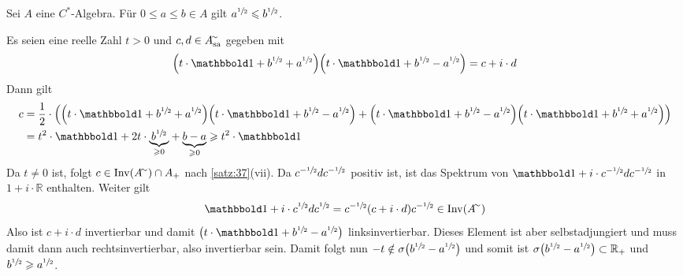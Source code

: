 \begin{satz}[{name=[Die Wurzel ist monoton]}]
	Sei $A$ eine $C^*$-Algebra. Für $0 \le a \le b \in A$ gilt $a^{\sfrac{1}{2}} \leqslant b^{\sfrac{1}{2}}$.
\end{satz}
\begin{beweis}
	Es seien eine reelle Zahl $t >0$ und $c,d \in A_\sa^\simm$ gegeben mit 
	\[
		\enbrace*{t \cdot \ind + b^{\sfrac{1}{2}} + a^{\sfrac{1}{2}}} \enbrace*{t \cdot \ind + b^{\sfrac{1}{2}} - a^{\sfrac{1}{2}}} = c + i \cdot d
	\]
	Dann gilt 
	\begin{align}
		c &=\frac{1}{2} \cdot \enbrace*{\enbrace*{t \cdot \ind + b^{\sfrac{1}{2}} + a^{\sfrac{1}{2}}}\enbrace*{t \cdot \ind + b^{\sfrac{1}{2}} -a^{\sfrac{1}{2}}} 
		+ \enbrace*{t \cdot \ind + b^{\sfrac{1}{2}}-a^{\sfrac{1}{2}}} \enbrace*{t \cdot \ind + b^{\sfrac{1}{2}} + a^{\sfrac{1}{2}}} } \\
		&= t^2 \cdot \ind + 2 t \cdot \Underbrace{b^{\sfrac{1}{2}}}{\ge 0} + \Underbrace{b -a}{\ge 0} \ge t^2 \cdot \ind
	\end{align}
	Da $t\neq 0$ ist, folgt $c \in \Inv(A^\simm) \cap A_+$ nach \autoref{satz:37}(vii). Da $c^{-\sfrac{1}{2}}d c^{-\sfrac{1}{2}}$ positiv ist, ist das Spektrum von 
	$\ind + i \cdot c^{-\sfrac{1}{2}}d c^{-\sfrac{1}{2}}$ in $1+ i \cdot \mathbb{R}$ enthalten. Weiter gilt
	\[
		\ind + i \cdot c^{\sfrac{1}{2}}d c^{\sfrac{1}{2}} = c^{-\sfrac{1}{2}}(c + i \cdot d) c^{-\sfrac{1}{2}} \in \Inv(A^\simm)
	\]
	Also ist $c+ i \cdot d$ invertierbar und damit $\enbrace*{t \cdot \ind + b^{\sfrac{1}{2}} - a^{\sfrac{1}{2}}}$ linksinvertierbar. 
	Dieses Element ist aber selbstadjungiert und muss damit dann auch rechtsinvertierbar, also invertierbar sein. 
	Damit folgt nun $-t \notin \sigma \enbrace*{b^{\sfrac{1}{2}} - a^{\sfrac{1}{2}}}$ und somit ist $\sigma \enbrace*{b^{\sfrac{1}{2}} - a^{\sfrac{1}{2}}} \subset \mathbb{R}_+$ und $b^{\sfrac{1}{2}} \geqslant a^{\sfrac{1}{2}}$.
\end{beweis}

